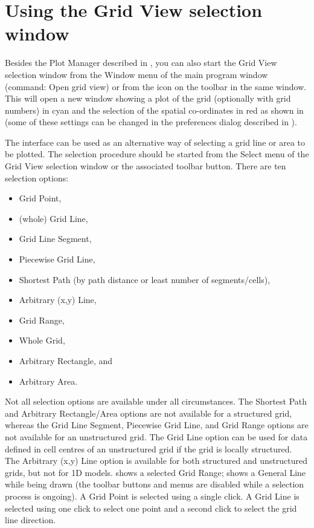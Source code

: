 \section{Using the Grid View selection window} \label{Sec:GridView}
Besides the Plot Manager described in , you can also start the Grid View selection window from the Window menu of the main program window (command: Open grid view) or from the icon on the toolbar in the same window.
This will open a new window showing a plot of the grid (optionally with grid numbers) in cyan and the selection of the spatial co-ordinates in red as shown in  (some of these settings can be changed in the preferences dialog described in ).

The interface can be used as an alternative way of selecting a grid line or area to be plotted.
The selection procedure should be started from the Select menu of the Grid View selection window or the associated toolbar button.
There are ten selection options:
\begin{itemize}
\item Grid Point,
\item (whole) Grid Line,
\item Grid Line Segment,
\item Piecewise Grid Line,
\item Shortest Path (by path distance or least number of segments/cells),
\item Arbitrary (x,y) Line,
\item Grid Range,
\item Whole Grid,
\item Arbitrary Rectangle, and
\item Arbitrary Area.
\end{itemize}
Not all selection options are available under all circumstances.
The Shortest Path and Arbitrary Rectangle/Area options are not available for a structured grid, whereas the Grid Line Segment, Piecewise Grid Line, and Grid Range options are not available for an unstructured grid.
The Grid Line option can be used for data defined in cell centres of an unstructured grid if the grid is locally structured.
The Arbitrary (x,y) Line option is available for both structured and unstructured grids, but not for 1D models.
 shows a selected Grid Range;  shows a General Line while being drawn (the toolbar buttons and menus are disabled while a selection process is ongoing).
A Grid Point is selected using a single click.
A Grid Line is selected using one click to select one point and a second click to select the grid line direction.
